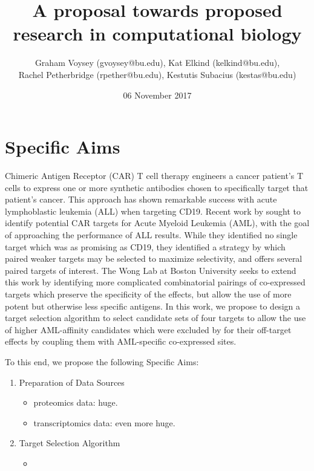 \documentclass[11pt]{article}
\begin{document}
\title{A proposal towards proposed research in computational biology}
\date{06 November 2017}
\author{Graham Voysey (gvoysey@bu.edu),
	    Kat Elkind (kelkind@bu.edu),\\
	    Rachel Petherbridge (rpether@bu.edu),
	    Kestutis Subacius (kestas@bu.edu)}
\maketitle
\section{Specific Aims}
Chimeric Antigen Receptor (CAR) T cell therapy engineers a cancer patient's T cells to express one or more synthetic antibodies chosen to specifically target that patient's cancer. This approach has shown remarkable success with acute lymphoblastic leukemia (ALL) when targeting CD19.  Recent work by \citet{Perna2017Integrating} sought to identify potential CAR targets for Acute Myeloid Leukemia (AML), with the goal of approaching the performance of ALL results.  While they identified no single target which was as promising as CD19, they identified a strategy by which paired weaker targets may be selected to maximize selectivity,  and offers several paired targets of interest.  The Wong Lab at Boston University seeks to extend this work by identifying more complicated combinatorial pairings of co-expressed targets which preserve the specificity of the effects, but allow the use of more potent but otherwise less specific antigens.   In this work, we propose to design a target selection algorithm to select candidate sets of four targets to allow the use of higher AML-affinity candidates which were excluded by \citeauthor{Perna2017Integrating} for their off-target effects by coupling them with AML-specific co-expressed sites.

To this end, we propose the following Specific Aims:

\begin{enumerate}
	\item{Preparation of Data Sources}
		\begin{itemize}
			\item proteomics data: huge.
			\item transcriptomics data: even more huge.
		\end{itemize}
	\item{Target Selection Algorithm}
		\begin{itemize}
			\item 
		\end{itemize}
\end{enumerate}
\end{document}
